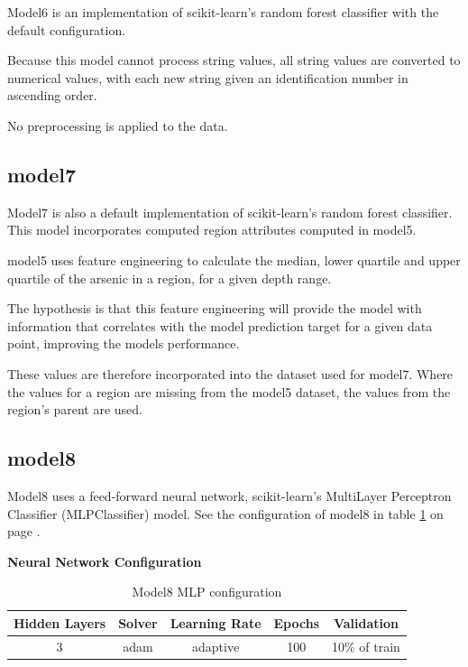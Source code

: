 Model6 is an implementation of scikit-learn's random forest classifier with the default configuration.

Because this model cannot process string values, all string values are converted to numerical values, with each new string given an identification number in ascending order.

No preprocessing is applied to the data.

\subsection{model7}

Model7 is also a default implementation of scikit-learn's random forest classifier. This model incorporates computed region attributes computed in model5.

model5 uses feature engineering to calculate the median, lower quartile and upper quartile of the arsenic in a region, for a given depth range.

The hypothesis is that this feature engineering will provide the model with information that correlates with the model prediction target for a given data point, improving the models performance.

These values are therefore incorporated into the dataset used for model7. Where the values for a region are missing from the model5 dataset, the values from the region's parent are used.

\subsection{model8}

Model8 uses a feed-forward neural network, scikit-learn's MultiLayer Perceptron Classifier (MLPClassifier) model. See the configuration of model8 in table \ref{tbl:x m8_config} on page \pageref{tbl:x m8_config}.

\textbf{Neural Network Configuration}

\begin{table}
    \centering
    \begin{tabular}{c c c c c} 
         \toprule
         Hidden Layers & Solver & Learning Rate & Epochs & Validation \\ [0.5ex] 
         \midrule
         3 & adam & adaptive & 100 & 10\% of train\\ 
         \bottomrule
    \end{tabular}
    \caption{Model8 MLP configuration}
    \label{tbl:x m8_config}
\end{table}

